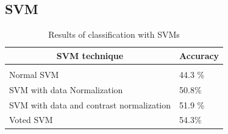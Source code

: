 \documentclass{article} %
\begin{document}
\subsection{SVM}
\begin{table}[t]
    \begin{center}
        \begin{tabular}{ll}
        \multicolumn{1}{c}{\bf SVM technique}  &\multicolumn{1}{c}{\bf Accuracy}
        \\ \hline \\
        Normal SVM         & 44.3 \% \\
        SVM with data Normalization             & 50.8\% \\
        SVM with data and contrast normalization &51.9 \% \\
        Voted SVM	& 54.3\% \\
        \end{tabular}
    \end{center}
    \caption{Results of classification with SVMs}
    \label{tab:svm}
\end{table}
\end{document}
